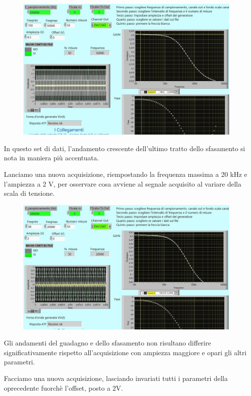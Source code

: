 \begin{figure}[H]
\caption{}
    \includegraphics[width=12cm]{settimana_2/immagini/CRRC_3.jpg}
    \centering
\end{figure}

In questo set di dati, l'andamento crescente dell'ultimo tratto dello sfasamento si nota in maniera più accentuata.

Lanciamo una nuova acquisizione, riempostando la frequenza massima a 20 kHz e l'ampiezza a 2 V, per osservare cosa avviene al segnale acquisito al variare della scala di tensione.

\begin{figure}[H]
\caption{}
    \includegraphics[width=12cm]{settimana_2/immagini/CRRC_4.jpg}
    \centering
\end{figure}
Gli andamenti del guadagno e dello sfasamento non risultano differire significativamente rispetto all'acquisizione con ampiezza maggiore e opari gli altri parametri.

Facciamo una nuova acquisizione, lasciando invariati tutti i parametri della oprecedente fuorchè l'offset, posto a 2V.

